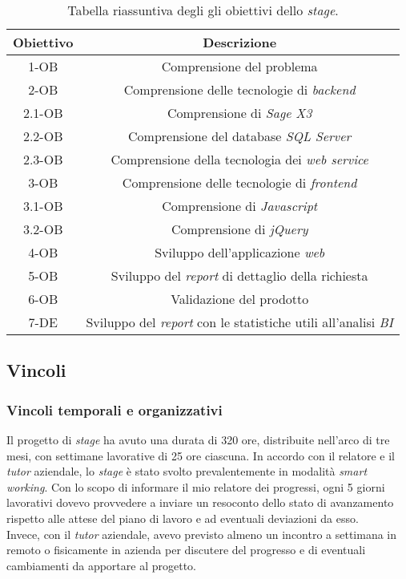 \begin{center}
	\begin{longtable}{|c|c|}
		\caption{Tabella riassuntiva degli gli obiettivi dello \textit{stage}.}\\
		\hline
		\textbf{Obiettivo} & \textbf{Descrizione}\\
		\hline
		1-OB & Comprensione del problema\\
		\hline
		2-OB & Comprensione delle tecnologie di \textit{backend}\\
		\hline
		2.1-OB & Comprensione di \textit{Sage X3}\\
		\hline
		2.2-OB & Comprensione del database \textit{SQL Server}\\
		\hline
		2.3-OB & Comprensione della tecnologia dei \textit{web service}\\
		\hline
		3-OB & Comprensione delle tecnologie di \textit{frontend}\\
		\hline
		3.1-OB & Comprensione di \textit{Javascript}\\
		\hline
		3.2-OB & Comprensione di \textit{jQuery}\\
		\hline
		4-OB & Sviluppo dell'applicazione \textit{web}\\
		\hline
		5-OB & Sviluppo del \textit{report} di dettaglio della richiesta\\
		\hline
		6-OB & Validazione del prodotto\\
		\hline
		7-DE & Sviluppo del \textit{report} con le statistiche utili all'analisi \textit{BI}\\
		\hline
	\end{longtable}
\end{center}


\subsection{Vincoli}
\subsubsection{Vincoli temporali e organizzativi}
Il progetto di \textit{stage} ha avuto una durata di 320 ore, distribuite nell'arco di tre mesi, con settimane lavorative di 25 ore ciascuna.
In accordo con il relatore e il \textit{tutor} aziendale, lo \textit{stage} è stato svolto prevalentemente in modalità \textit{smart working}.
Con lo scopo di informare il mio relatore  dei progressi, ogni 5 giorni lavorativi dovevo provvedere a inviare un resoconto dello stato di avanzamento rispetto alle attese del piano di lavoro e ad eventuali deviazioni da esso.\\Invece, con il \textit{tutor} aziendale, avevo previsto almeno un incontro a settimana in remoto o fisicamente in azienda per discutere del progresso e di eventuali cambiamenti da apportare al progetto.
